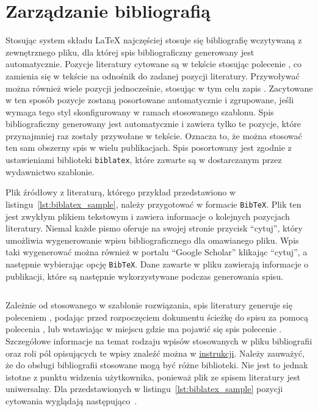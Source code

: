 \section{Zarządzanie bibliografią}

Stosując system składu \LaTeX{} najczęściej stosuje się bibliografię wczytywaną z zewnętrznego pliku, dla której spis bibliograficzny generowany jest automatycznie. Pozycje literatury cytowane są w tekście stosując polecenie \texttt{\cite{nazwa_pozycji}}, co zamienia się w tekście na odnośnik do zadanej pozycji literatury. Przywoływać można również wiele pozycji jednocześnie, stosując w tym celu zapis \texttt{\cite{nazwa1, nazwa2}}. Zacytowane w ten sposób pozycje zostaną posortowane automatycznie i zgrupowane, jeśli wymaga tego styl skonfigurowany w ramach stosowanego szablonu. Spis bibliograficzny generowany jest automatycznie i zawiera tylko te pozycje, które przynajmniej raz zostały przywołane w tekście. Oznacza to, że można stosować ten sam obszerny spis w wielu publikacjach. Spis posortowany jest zgodnie z ustawieniami biblioteki \texttt{biblatex}, które zawarte są w dostarczanym przez wydawnictwo szablonie.

Plik źródłowy z literaturą, którego przykład przedstawiono w listingu~\ref{lst:biblatex_sample}, należy przygotować w formacie \texttt{BibTeX}. Plik ten jest zwykłym plikiem tekstowym i zawiera informacje o kolejnych pozycjach literatury. Niemal każde pismo oferuje na swojej stronie przycisk \enquote{cytuj}, który umożliwia wygenerowanie wpisu bibliograficznego dla omawianego pliku. Wpis taki wygenerować można również w portalu \enquote{Google Scholar} klikając \enquote{cytuj}, a następnie wybierając opcję \texttt{BibTeX}. Dane zawarte w pliku zawierają informacje o publikacji, które są następnie wykorzystywane podczas generowania spisu.

\begin{listing}[hbt]
\inputminted{bibtex}{skrypty/biblatex_sample.bib}
\end{listing}

Zależnie od stosowanego w szablonie rozwiązania, spis literatury generuje się poleceniem \texttt{\printbibliography}, podając przed rozpoczęciem dokumentu ścieżkę do spisu za pomocą polecenia \texttt{}, lub wstawiając w miejscu gdzie ma pojawić się spis polecenie \texttt{}. Szczegółowe informacje na temat rodzaju wpisów stosowanych w pliku bibliografii oraz roli pól opisujących te wpisy znaleźć można w \href{https://www.overleaf.com/learn/latex/Bibliography_management_in_LaTeX}{instrukcji}. Należy zauważyć, że do obsługi bibliografii stosowane mogą być różne biblioteki. Nie jest to jednak istotne z punktu widzenia użytkownika, ponieważ plik ze spisem literatury jest uniwersalny. Dla przedstawionych w listingu~\ref{lst:biblatex_sample} pozycji cytowania wyglądają następująco~\cite{ldrjro_dwtownerr, mallat_wavelet}.


